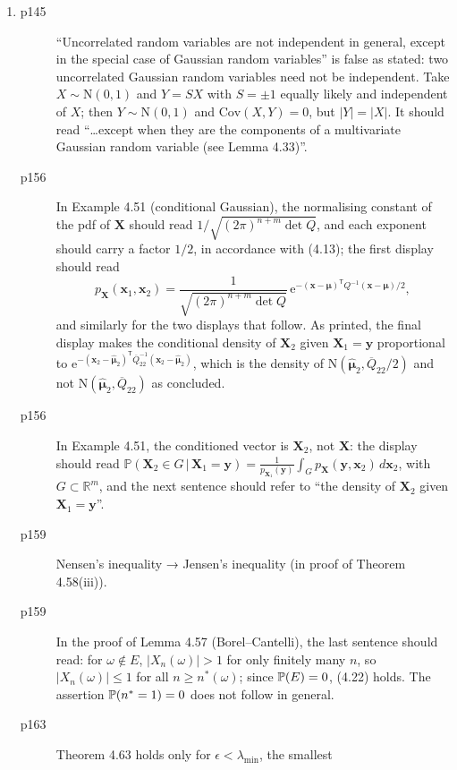 \documentclass[final]{article}
\theoremstyle{definition}
\newcommand{\vecbs}[1]{\boldsymbol{#1}}
\renewcommand{\vec}[1]{{\vecbs{#1}}}
\begin{document}
\begin{enumerate}
\begin{description}
with $A$ (for instance, that $B$ be a function of $A$); it is false for general
$B\in\mathcal{L}(H)$. 
\end{description}
 \item%
   \begin{description}
   \item[p145] ``Uncorrelated random variables are not independent in general,
except in the special case of Gaussian random variables'' is false as stated:
two uncorrelated Gaussian random variables need not be independent. Take
$X\sim\mathrm{N}(0,1)$ and $Y=SX$ with $S=\pm1$ equally likely and independent
of $X$; then $Y\sim\mathrm{N}(0,1)$ and $\mathrm{Cov}(X,Y)=0$, but $|Y|=|X|$. It
should read ``\dots except when they are the components of a multivariate
Gaussian random variable (see Lemma 4.33)''.
   \item[p156] In Example 4.51 (conditional Gaussian), the normalising constant
of the pdf of $\vec X$ should read $1/\sqrt{(2\pi)^{n+m}\det Q}$, and each
exponent should carry a factor $1/2$, in accordance with (4.13); the first
display should read
\[
p_{\vec X}(\vec x_1,\vec x_2)
=\frac{1}{\sqrt{(2\pi)^{n+m}\det Q}}\,
\mathrm{e}^{-(\vec x-\vec\mu)^{\mathsf{T}}Q^{-1}(\vec x-\vec\mu)/2},
\]
and similarly for the two displays that follow. As printed, the final display
makes the conditional density of $\vec X_2$ given $\vec X_1=\vec y$ proportional
to $\mathrm{e}^{-(\vec x_2-\widehat{\vec\mu}_2)^{\mathsf{T}}\overline{Q}_{22}^{-1}(\vec x_2-\widehat{\vec\mu}_2)}$,
which is the density of $\mathrm{N}(\widehat{\vec\mu}_2,\overline{Q}_{22}/2)$
and not $\mathrm{N}(\widehat{\vec\mu}_2,\overline{Q}_{22})$ as concluded.
   \item[p156] In Example 4.51, the conditioned vector is $\vec X_2$, not
$\vec X$: the display should read
$\mathbb{P}(\vec X_2\in G\,|\,\vec X_1=\vec y)=\frac{1}{p_{\vec X_1}(\vec y)}\int_G p_{\vec X}(\vec y,\vec x_2)\,d\vec x_2$,
with $G\subset\mathbb{R}^m$, and the next sentence should refer to ``the density
of $\vec X_2$ given $\vec X_1=\vec y$''.
   \item[p159] Nensen’s inequality → Jensen’s inequality (in proof of Theorem 4.58(iii)).
   \item[p159] In the proof of Lemma 4.57 (Borel--Cantelli), the last sentence
should read: for $\omega\notin E$, $|X_n(\omega)|>1$ for only finitely many $n$,
so $|X_n(\omega)|\le 1$ for all $n\ge n^*(\omega)$; since ${\mathbb{P}}(E)=0$, (4.22)
holds. The assertion ${\mathbb{P}}(n^*=1)=0$ does not follow  in general.
   \item[p163] Theorem 4.63 holds only for $\epsilon<\lambda_{\min}$, the smallest

\end{description}
\end{enumerate}
\end{document}

